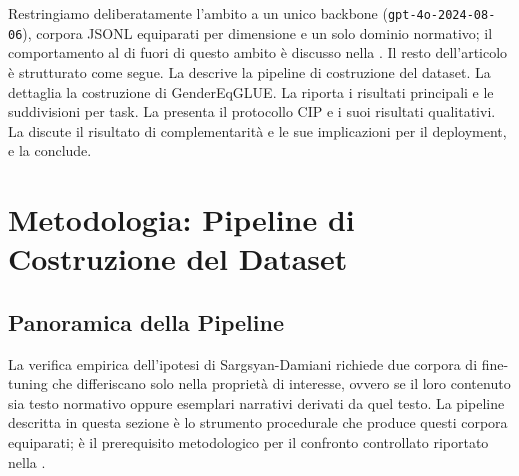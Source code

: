 \documentclass[pdflatex, sn-apa]{sn-jnl}%
\theoremstyle{thmstyleone}%
\theoremstyle{thmstyletwo}%
\theoremstyle{thmstylethree}%
\begin{document}
Restringiamo deliberatamente l'ambito a un unico backbone
(\texttt{gpt-4o-2024-08-06}), corpora JSONL equiparati per dimensione e un solo
dominio normativo; il comportamento al di fuori di questo ambito è discusso nella
. Il resto dell'articolo è strutturato come segue. La
 descrive la pipeline di costruzione del dataset. La
 dettaglia la costruzione di GenderEqGLUE. La
 riporta i risultati principali e le suddivisioni per task. La
 presenta il protocollo CIP e i suoi risultati qualitativi. La
 discute il risultato di complementarità e le sue
implicazioni per il deployment, e la  conclude.

\section{Metodologia: Pipeline di Costruzione del Dataset}
\label{sec:method}

\subsection{Panoramica della Pipeline}
\label{sec:method:overview}

La verifica empirica dell'ipotesi di Sargsyan-Damiani richiede due corpora di
fine-tuning che differiscano solo nella proprietà di interesse, ovvero se il loro
contenuto sia testo normativo oppure esemplari narrativi derivati da quel testo.
La pipeline descritta in questa sezione è lo strumento procedurale che produce
questi corpora equiparati; è il prerequisito metodologico per il confronto
controllato riportato nella .
\end{document}
